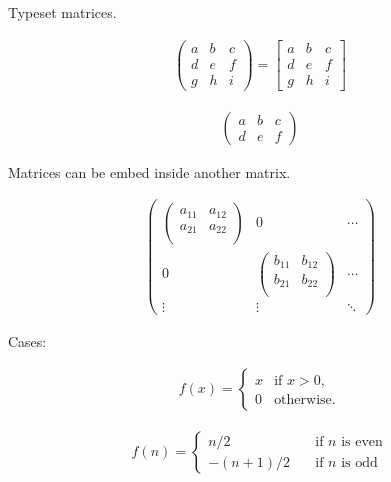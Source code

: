 \documentclass[conference]{IEEEtran}
\begin{document}
Typeset matrices.

\begin{gather*}
  \begin{pmatrix}
    a & b & c \\
    d & e & f \\
    g & h & i
  \end{pmatrix} =
  \begin{bmatrix}
    a & b & c \\
    d & e & f \\
    g & h & i
  \end{bmatrix}
\end{gather*}

\begin{gather*}
  \left(\begin{array}{cc|c}
    a & b & c \\
    d & e & f
  \end{array}\right)
\end{gather*}

Matrices can be embed inside another matrix.

\begin{gather*}
  \begin{pmatrix}
    \begin{pmatrix}
      a_{11} & a_{12} \\
      a_{21} & a_{22} \\
    \end{pmatrix}
           & 0      & \cdots \\
    0      &
    \begin{pmatrix}
      b_{11} & b_{12} \\
      b_{21} & b_{22} \\
    \end{pmatrix}
           & \cdots          \\
    \vdots & \vdots & \ddots
  \end{pmatrix}
\end{gather*}

Cases:

\begin{gather*}
  f(x) = \left\{
  \begin{array}{ll}
    x & \text{if } x > 0, \\
    0 & \text{otherwise}.
  \end{array}\right.
\end{gather*}

\begin{gather*}
  f(n) =
  \begin{cases}
    n/2      & \quad \text{if } n \text{ is even} \\
    -(n+1)/2 & \quad \text{if } n \text{ is odd}
  \end{cases}
\end{gather*}
\end{document}
